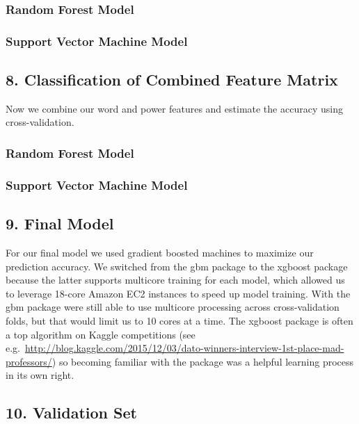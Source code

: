\documentclass[12pt,]{article}
\begin{document}
\subsubsection{Random Forest Model}\label{random-forest-model-1}

\subsubsection{Support Vector Machine
Model}\label{support-vector-machine-model-1}

\subsection{8. Classification of Combined Feature
Matrix}\label{classification-of-combined-feature-matrix}

Now we combine our word and power features and estimate the accuracy
using cross-validation.

\subsubsection{Random Forest Model}\label{random-forest-model-2}

\subsubsection{Support Vector Machine
Model}\label{support-vector-machine-model-2}

\subsection{9. Final Model}\label{final-model}

For our final model we used gradient boosted machines to maximize our
prediction accuracy. We switched from the gbm package to the xgboost
package because the latter supports multicore training for each model,
which allowed us to leverage 18-core Amazon EC2 instances to speed up
model training. With the gbm package were still able to use multicore
processing across cross-validation folds, but that would limit us to 10
cores at a time. The xgboost package is often a top algorithm on Kaggle
competitions (see
e.g.~\url{http://blog.kaggle.com/2015/12/03/dato-winners-interview-1st-place-mad-professors/})
so becoming familiar with the package was a helpful learning process in
its own right.

\subsection{10. Validation Set}\label{validation-set}
\end{document}
